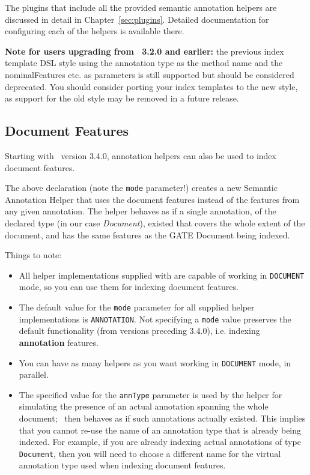 The plugins that include all the provided semantic annotation helpers are
discussed in detail in Chapter~\ref{sec:plugins}. Detailed documentation for
configuring each of the helpers is available there.

{\bf Note for users upgrading from \Mimir\ 3.2.0 and earlier:} the previous
index template DSL style using the annotation type as the method name and the
nominalFeatures etc. as parameters is still supported but should be considered
deprecated.  You should consider porting your index templates to the new style,
as support for the old style may be removed in a future release.

\subsection*{Document Features}\label{sec:indexing:docfeats}
Starting with \Mimir\ version 3.4.0, annotation helpers can also be used to
index document features.
\clearpage
{}

The above declaration (note the {\tt mode} parameter!) creates a new Semantic
Annotation Helper that uses the document features instead of the features from
any given annotation. The helper behaves as if a single annotation, of the
declared type (in our case {\it Document}), existed that covers the whole extent
of the document, and has the same features as the GATE Document being indexed.

Things to note:
\begin{itemize}
  \item All helper implementations supplied with \Mimir{} are capable of working
  in {\tt DOCUMENT} mode, so you can use them for indexing document features.
  \item The default value for the {\tt mode} parameter for all supplied helper
  implementations is {\tt ANNOTATION}. Not specifying a {\tt mode} value
  preserves the default functionality (from versions preceding 3.4.0), i.e.
  indexing {\bf annotation} features.
  \item You can have as many helpers as you want working in {\tt DOCUMENT}
  mode, in parallel.
  \item The specified value for the {\tt annType} parameter is used by the
  helper for simulating the presence of an actual annotation spanning the whole
  document; \Mimir\ then behaves as if such annotations actually existed. This
  implies that you cannot re-use the name of an annotation type that is already
  being indexed. For example, if you are already indexing actual annotations of
  type {\tt Document}, then you will need to choose a different name for the
  virtual annotation type used when indexing document features.
\end{itemize}

